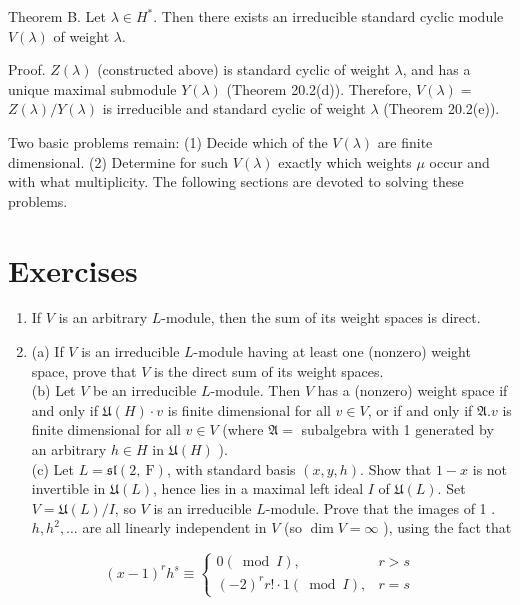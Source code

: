 \documentclass[10pt]{article}
\begin{document}
Theorem B. Let $\lambda \in H^{*}$. Then there exists an irreducible standard cyclic module $V(\lambda)$ of weight $\lambda$.

Proof. $Z(\lambda)$ (constructed above) is standard cyclic of weight $\lambda$, and has a unique maximal submodule $Y(\lambda)$ (Theorem 20.2(d)). Therefore, $V(\lambda)=$ $Z(\lambda) / Y(\lambda)$ is irreducible and standard cyclic of weight $\lambda$ (Theorem 20.2(e)).

Two basic problems remain: (1) Decide which of the $V(\lambda)$ are finite dimensional. (2) Determine for such $V(\lambda)$ exactly which weights $\mu$ occur and with what multiplicity. The following sections are devoted to solving these problems.

\section*{Exercises}
\begin{enumerate}
  \item If $V$ is an arbitrary $L$-module, then the sum of its weight spaces is direct.
  \item (a) If $V$ is an irreducible $L$-module having at least one (nonzero) weight space, prove that $V$ is the direct sum of its weight spaces.\\
(b) Let $V$ be an irreducible $L$-module. Then $V$ has a (nonzero) weight space if and only if $\mathfrak{U}(H) \cdot v$ is finite dimensional for all $v \in V$, or if and only if $\mathfrak{A} . v$ is finite dimensional for all $v \in V$ (where $\mathfrak{A}=$ subalgebra with 1 generated by an arbitrary $h \in H$ in $\mathfrak{U}(H)$ ).\\
(c) Let $L=\mathfrak{s l}(2, \mathrm{~F})$, with standard basis $(x, y, h)$. Show that $1-x$ is not invertible in $\mathfrak{U}(L)$, hence lies in a maximal left ideal $I$ of $\mathfrak{U}(L)$. Set $V=\mathfrak{U}(L) / I$, so $V$ is an irreducible $L$-module. Prove that the images of 1 . $h, h^{2}, \ldots$ are all linearly independent in $V$ (so $\operatorname{dim} V=\infty$ ), using the fact that
\end{enumerate}

$$
(x-1)^{r} h^{s} \equiv \begin{cases}0(\bmod I), & r>s \\ (-2)^{r} r!\cdot 1(\bmod I), & r=s\end{cases}
$$
\end{document}
